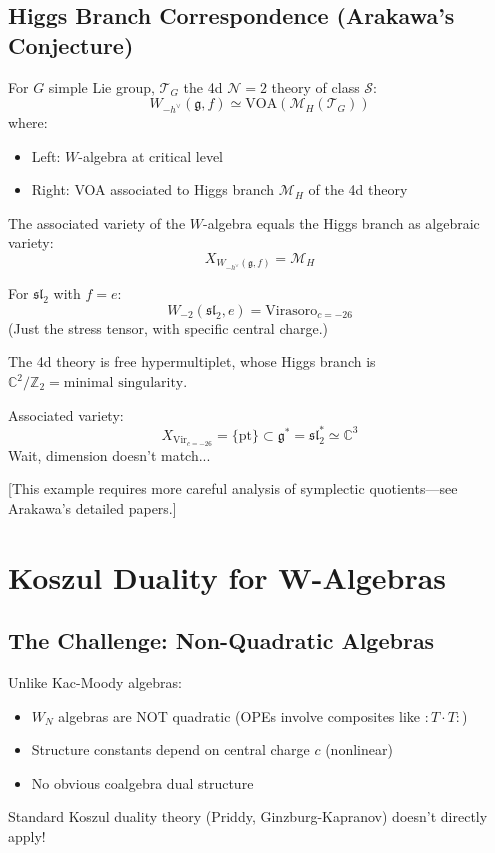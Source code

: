 \subsection{Higgs Branch Correspondence (Arakawa's Conjecture)}

\begin{conjecture}
\label{conj:higgs-branch}
For $G$ simple Lie group, $\mathcal{T}_G$ the 4d $\mathcal{N}=2$ theory of class $\mathcal{S}$:
$$W_{-h^\vee}(\mathfrak{g}, f) \simeq \text{VOA}(\mathcal{M}_H(\mathcal{T}_G))$$
where:
\begin{itemize}
\item Left: $W$-algebra at critical level
\item Right: VOA associated to Higgs branch $\mathcal{M}_H$ of the 4d theory
\end{itemize}

The associated variety of the $W$-algebra equals the Higgs branch as algebraic variety:
$$X_{W_{-h^\vee}(\mathfrak{g}, f)} = \mathcal{M}_H$$
\end{conjecture}

\begin{example}
For $\mathfrak{sl}_2$ with $f = e$:
$$W_{-2}(\mathfrak{sl}_2, e) = \text{Virasoro}_{c=-26}$$
(Just the stress tensor, with specific central charge.)

The 4d theory is free hypermultiplet, whose Higgs branch is $\mathbb{C}^2/\mathbb{Z}_2 = \text{minimal singularity}$.

Associated variety:
$$X_{\text{Vir}_{c=-26}} = \{\text{pt}\} \subset \mathfrak{g}^* = \mathfrak{sl}_2^* \simeq \mathbb{C}^3$$
Wait, dimension doesn't match...

[This example requires more careful analysis of symplectic quotients—see Arakawa's detailed papers.]
\end{example}

\section{Koszul Duality for W-Algebras}

\subsection{The Challenge: Non-Quadratic Algebras}

\begin{remark}
Unlike Kac-Moody algebras:
\begin{itemize}
\item $W_N$ algebras are NOT quadratic (OPEs involve composites like $: T \cdot T :$)
\item Structure constants depend on central charge $c$ (nonlinear)
\item No obvious coalgebra dual structure
\end{itemize}

Standard Koszul duality theory (Priddy, Ginzburg-Kapranov) doesn't directly apply!
\end{remark}

